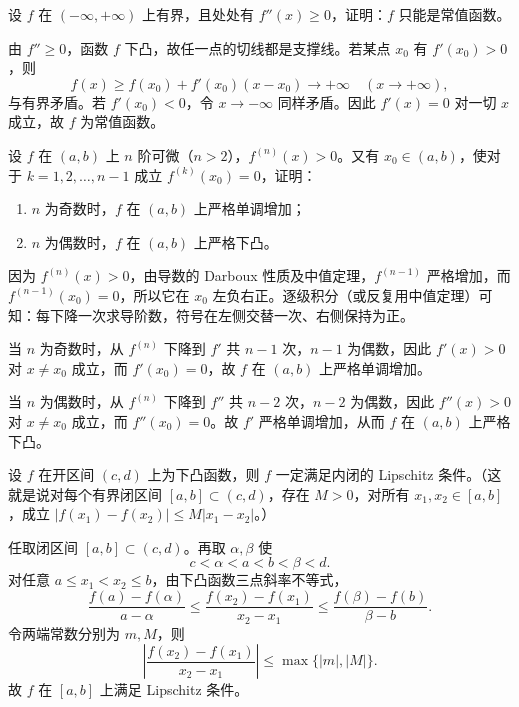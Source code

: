 \begin{xexercise}[8]
设 $f$ 在 $(-\infty,+\infty)$ 上有界，且处处有 $f''(x)\ge0$，证明：$f$ 只能是常值函数。
\end{xexercise}
\begin{xsolution}
由 $f''\ge0$，函数 $f$ 下凸，故任一点的切线都是支撑线。若某点 $x_0$ 有 $f'(x_0)>0$，则
\[
  f(x)\ge f(x_0)+f'(x_0)(x-x_0)\to+\infty
  \quad(x\to+\infty),
\]
与有界矛盾。若 $f'(x_0)<0$，令 $x\to-\infty$ 同样矛盾。因此 $f'(x)=0$ 对一切 $x$ 成立，故 $f$ 为常值函数。
\end{xsolution}


\begin{xexercise}[9]
设 $f$ 在 $(a,b)$ 上 $n$ 阶可微（$n>2$），$f^{(n)}(x)>0$。又有 $x_0\in(a,b)$，使对于 $k=1,2,\ldots,n-1$ 成立 $f^{(k)}(x_0)=0$，证明：
  \begin{enumerate}[label=(\arabic*)]
    \item $n$ 为奇数时，$f$ 在 $(a,b)$ 上严格单调增加；
    \item $n$ 为偶数时，$f$ 在 $(a,b)$ 上严格下凸。
  \end{enumerate}
\end{xexercise}
\begin{xsolution}
因为 $f^{(n)}(x)>0$，由导数的 Darboux 性质及中值定理，$f^{(n-1)}$ 严格增加，而 $f^{(n-1)}(x_0)=0$，所以它在 $x_0$ 左负右正。逐级积分（或反复用中值定理）可知：每下降一次求导阶数，符号在左侧交替一次、右侧保持为正。

当 $n$ 为奇数时，从 $f^{(n)}$ 下降到 $f'$ 共 $n-1$ 次，$n-1$ 为偶数，因此 $f'(x)>0$ 对 $x\ne x_0$ 成立，而 $f'(x_0)=0$，故 $f$ 在 $(a,b)$ 上严格单调增加。

当 $n$ 为偶数时，从 $f^{(n)}$ 下降到 $f''$ 共 $n-2$ 次，$n-2$ 为偶数，因此 $f''(x)>0$ 对 $x\ne x_0$ 成立，而 $f''(x_0)=0$。故 $f'$ 严格单调增加，从而 $f$ 在 $(a,b)$ 上严格下凸。
\end{xsolution}


\begin{xexercise}[10]
设 $f$ 在开区间 $(c,d)$ 上为下凸函数，则 $f$ 一定满足内闭的 Lipschitz 条件。（这就是说对每个有界闭区间 $[a,b]\subset(c,d)$，存在 $M>0$，对所有 $x_1,x_2\in[a,b]$，成立 $|f(x_1)-f(x_2)|\le M|x_1-x_2|$。）
\end{xexercise}
\begin{xsolution}
任取闭区间 $[a,b]\subset(c,d)$。再取 $\alpha,\beta$ 使
\[
  c<\alpha<a<b<\beta<d.
\]
对任意 $a\le x_1<x_2\le b$，由下凸函数三点斜率不等式，
\[
  \frac{f(a)-f(\alpha)}{a-\alpha}
  \le\frac{f(x_2)-f(x_1)}{x_2-x_1}
  \le\frac{f(\beta)-f(b)}{\beta-b}.
\]
令两端常数分别为 $m,M$，则
\[
  \left|\frac{f(x_2)-f(x_1)}{x_2-x_1}\right|
  \le\max\{|m|,|M|\}.
\]
故 $f$ 在 $[a,b]$ 上满足 Lipschitz 条件。
\end{xsolution}


